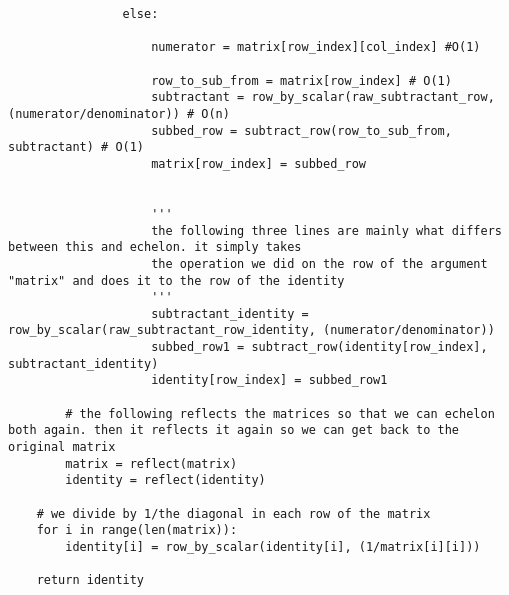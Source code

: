 \documentclass[12pt, a4paper]{article}
\begin{document}
\begin{lstlisting}
                else:

                    numerator = matrix[row_index][col_index] #O(1)

                    row_to_sub_from = matrix[row_index] # O(1)
                    subtractant = row_by_scalar(raw_subtractant_row, (numerator/denominator)) # O(n)
                    subbed_row = subtract_row(row_to_sub_from, subtractant) # O(1)
                    matrix[row_index] = subbed_row

                    
                    '''
                    the following three lines are mainly what differs between this and echelon. it simply takes
                    the operation we did on the row of the argument "matrix" and does it to the row of the identity
                    '''
                    subtractant_identity = row_by_scalar(raw_subtractant_row_identity, (numerator/denominator))
                    subbed_row1 = subtract_row(identity[row_index], subtractant_identity)
                    identity[row_index] = subbed_row1  
        
        # the following reflects the matrices so that we can echelon both again. then it reflects it again so we can get back to the original matrix
        matrix = reflect(matrix)
        identity = reflect(identity)

    # we divide by 1/the diagonal in each row of the matrix 
    for i in range(len(matrix)):
        identity[i] = row_by_scalar(identity[i], (1/matrix[i][i]))

    return identity
    

\end{lstlisting}
\end{document}

